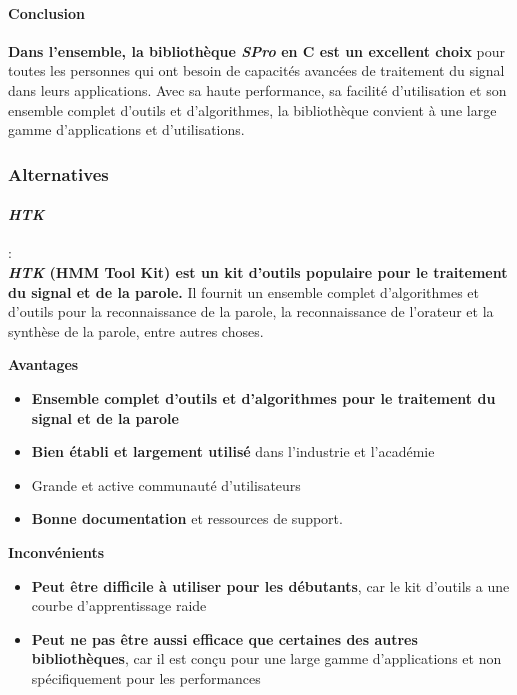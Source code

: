 \paragraph*{Conclusion}
\textbf{Dans l'ensemble, la bibliothèque \textit{SPro} en C est un excellent choix} pour toutes les personnes qui ont besoin de capacités avancées de traitement du signal dans leurs applications.
Avec sa haute performance, sa facilité d'utilisation et son ensemble complet d'outils et d'algorithmes, la bibliothèque convient à une large gamme d'applications et d'utilisations.

\subsubsection*{Alternatives}

\paragraph*{\textbf{\textit{HTK}}}: \\
\textbf{\textit{HTK} (HMM Tool Kit) est un kit d'outils populaire pour le traitement du signal et de la parole.} Il fournit un ensemble complet d'algorithmes et d'outils
pour la reconnaissance de la parole, la reconnaissance de l'orateur et la synthèse de la parole, entre autres choses.

\textbf{Avantages}
\begin{itemize}
      \item \textbf{Ensemble complet d'outils et d'algorithmes pour le traitement du signal et de la parole}
      \item \textbf{Bien établi et largement utilisé} dans l'industrie et l'académie
      \item Grande et active communauté d'utilisateurs
      \item \textbf{Bonne documentation} et ressources de support.
\end{itemize}


\textbf{Inconvénients}
\begin{itemize}
      \item \textbf{Peut être difficile à utiliser pour les débutants}, car le kit d'outils a une courbe d'apprentissage raide
      \item \textbf{Peut ne pas être aussi efficace que certaines des autres bibliothèques}, car il est conçu pour une large gamme
            d'applications et non spécifiquement pour les performances
\end{itemize}

